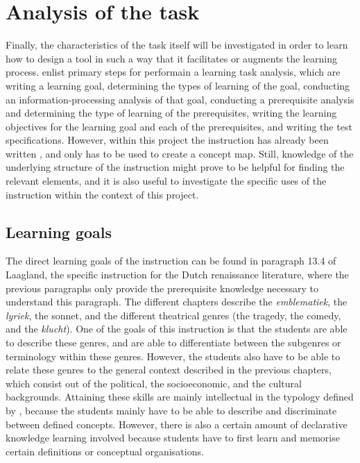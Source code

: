 \section{Analysis of the task}

Finally, the characteristics of the task itself will be investigated in order to learn how to design a tool in such a way that it facilitates or augments the learning process.  enlist primary steps for performain a learning task analysis, which are writing a learning goal, determining the types of learning of the goal, conducting an information-processing analysis of that goal, conducting a prerequisite analysis and determining the type of learning of the prerequisites, writing the learning objectives for the learning goal and each of the prerequisites, and writing the test specifications. However, within this project the instruction has already been written \cite{laagland}, and only has to be used to create a concept map. Still, knowledge of the underlying structure of the instruction might prove to be helpful for finding the relevant elements, and it is also useful to investigate the specific uses of the instruction within the context of this project.

\subsection{Learning goals}

The direct learning goals of the instruction can be found in paragraph 13.4 of Laagland, the specific instruction for the Dutch renaissance literature, where the previous paragraphs only provide the prerequisite knowledge necessary to understand this paragraph. The different chapters describe the \emph{emblematiek}, the \emph{lyriek}, the sonnet, and the different theatrical genres (the tragedy, the comedy, and the \emph{klucht}). One of the goals of this instruction is that the students are able to describe these genres, and are able to differentiate between the subgenres or terminology within these genres. However, the students also have to be able to relate these genres to the general context described in the previous chapters, which consist out of the political, the socioeconomic, and the cultural backgrounds. Attaining these skills are mainly intellectual in the typology defined by , because the students mainly have to be able to describe and discriminate between defined concepts. However, there is also a certain amount of declarative knowledge learning involved because students have to first learn and memorise certain definitions or conceptual organisations.



